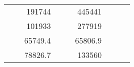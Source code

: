 \begin{table}[H]
\begin{tabular}{|ccrccrccc}
\multicolumn{1}{|c|}{\cellcolor[HTML]{FFFFC7}}                                & \multicolumn{1}{c|}{\cellcolor[HTML]{DDFDFF}}                      & \multicolumn{1}{r|}{\cellcolor[HTML]{DAE8FC}191744}    & \multicolumn{1}{c|}{\cellcolor[HTML]{FFFFC7}}                                & \multicolumn{1}{c|}{\cellcolor[HTML]{DDFDFF}}                       & \multicolumn{1}{r|}{\cellcolor[HTML]{DDFDFF}445441}    &                                                                              &                                                                    &                                                        \\ \cline{3-3} \cline{6-6}
\multicolumn{1}{|c|}{\cellcolor[HTML]{FFFFC7}}                                & \multicolumn{1}{c|}{\cellcolor[HTML]{DDFDFF}}                      & \multicolumn{1}{r|}{\cellcolor[HTML]{DDFDFF}101933}    & \multicolumn{1}{c|}{\cellcolor[HTML]{FFFFC7}}                                & \multicolumn{1}{c|}{\cellcolor[HTML]{DDFDFF}}                       & \multicolumn{1}{r|}{\cellcolor[HTML]{DAE8FC}277919}    &                                                                              &                                                                    &                                                        \\ \cline{3-3} \cline{6-6}
\multicolumn{1}{|c|}{\cellcolor[HTML]{FFFFC7}}                                & \multicolumn{1}{c|}{\cellcolor[HTML]{DDFDFF}}                      & \multicolumn{1}{r|}{\cellcolor[HTML]{DAE8FC}65749.4}   & \multicolumn{1}{c|}{\cellcolor[HTML]{FFFFC7}}                                & \multicolumn{1}{c|}{\cellcolor[HTML]{DDFDFF}}                       & \multicolumn{1}{r|}{\cellcolor[HTML]{DDFDFF}65806.9}   &                                                                              &                                                                    &                                                        \\ \cline{3-3} \cline{6-6}
\multicolumn{1}{|c|}{\cellcolor[HTML]{FFFFC7}}                                & \multicolumn{1}{c|}{\cellcolor[HTML]{DDFDFF}}                      & \multicolumn{1}{r|}{\cellcolor[HTML]{DDFDFF}78826.7}   & \multicolumn{1}{c|}{\cellcolor[HTML]{FFFFC7}}                                & \multicolumn{1}{c|}{\cellcolor[HTML]{DDFDFF}}                       & \multicolumn{1}{r|}{\cellcolor[HTML]{DAE8FC}133560}    &                                                                              &                                                                    &                                                        \\ \cline{3-3} \cline{6-6}

\end{tabular}
\end{table}
